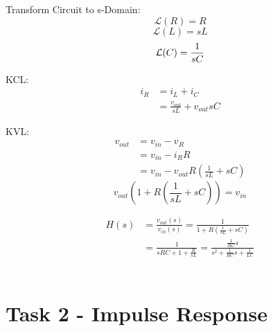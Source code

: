 \documentclass[12pt]{report}
\begin{document}
Transform Circuit to s-Domain: \\
\begin{equation*}
	\mathcal{L}(R) = R
\end{equation*}
\begin{equation*}
	\mathcal{L}(L) = sL
\end{equation*}
\begin{equation*}
	\mathcal{L}(C) = \frac{1}{sC} \\
\end{equation*}

KCL:
\begin{align*}
	i_R &= i_L + i_C \\
	&= \frac{v_{out}}{sL} + v_{out}sC
\end{align*}

KVL:
\begin{align*}
	v_{out} &= v_{in} - v_R \\
	&= v_{in} - i_RR \\
	&= v_{in} - v_{out}R(\frac{1}{sL} + sC)
\end{align*}
\begin{equation*}
	v_{out}(1 + R(\frac{1}{sL} + sC)) = v_{in}
\end{equation*}

\begin{align*}
	H(s) &= \frac{v_{out}(s)}{v_{in}(s)} = \frac{1}{1 + R(\frac{1}{sL} + sC)} \\
	&= \frac{1}{sRC + 1 + \frac{R}{sL}} = \frac{\frac{1}{RC}s}{s^2 + \frac{1}{RC}s + \frac{1}{LC}}
\end{align*} \\

\section{Task 2 - Impulse Response}
\end{document}
